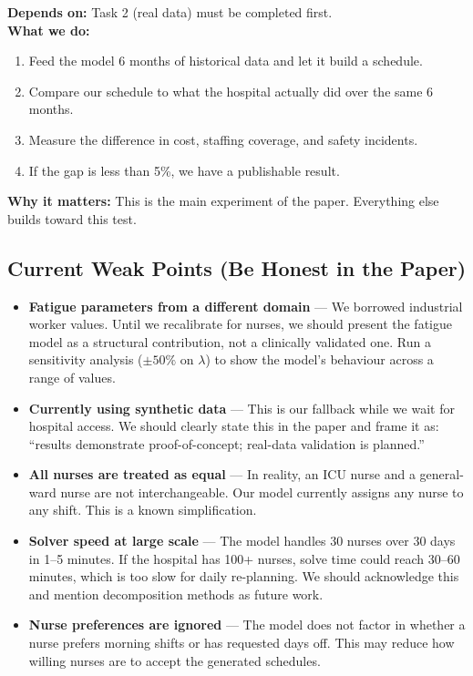 \documentclass[12pt,a4paper]{article}
\begin{document}
\vspace{6pt}
\begin{warnbox}
\textbf{Depends on:} Task 2 (real data) must be completed first.\\[4pt]
\textbf{What we do:}
\begin{enumerate}[itemsep=2pt]
  \item Feed the model 6 months of historical data and let it build a schedule.
  \item Compare our schedule to what the hospital actually did over the same 6 months.
  \item Measure the difference in cost, staffing coverage, and safety incidents.
  \item If the gap is less than 5\%, we have a publishable result.
\end{enumerate}
\textbf{Why it matters:} This is the main experiment of the paper. Everything else builds toward this test.
\end{warnbox}

\subsection{Current Weak Points (Be Honest in the Paper)}

\begin{warnbox}
\begin{itemize}[itemsep=6pt]
  \item \textbf{Fatigue parameters from a different domain} — We borrowed industrial worker values. Until we recalibrate for nurses, we should present the fatigue model as a structural contribution, not a clinically validated one. Run a sensitivity analysis ($\pm50\%$ on $\lambda$) to show the model's behaviour across a range of values.

  \item \textbf{Currently using synthetic data} — This is our fallback while we wait for hospital access. We should clearly state this in the paper and frame it as: ``results demonstrate proof-of-concept; real-data validation is planned.''

  \item \textbf{All nurses are treated as equal} — In reality, an ICU nurse and a general-ward nurse are not interchangeable. Our model currently assigns any nurse to any shift. This is a known simplification.

  \item \textbf{Solver speed at large scale} — The model handles 30 nurses over 30 days in 1–5 minutes. If the hospital has 100+ nurses, solve time could reach 30–60 minutes, which is too slow for daily re-planning. We should acknowledge this and mention decomposition methods as future work.

  \item \textbf{Nurse preferences are ignored} — The model does not factor in whether a nurse prefers morning shifts or has requested days off. This may reduce how willing nurses are to accept the generated schedules.
\end{itemize}
\end{warnbox}
\end{document}
